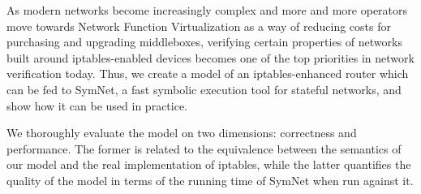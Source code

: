
As modern networks become increasingly complex and more and more operators move
towards Network Function Virtualization as a way of reducing costs for
purchasing and upgrading middleboxes, verifying certain properties of networks
built around iptables-enabled devices becomes one of the top priorities in
network verification today.  Thus, we create a model of an iptables-enhanced
router which can be fed to SymNet, a fast symbolic execution tool for stateful
networks, and show how it can be used in practice.

We thoroughly evaluate the model on two dimensions: correctness and
performance.  The former is related to the equivalence between the semantics of
our model and the real implementation of iptables, while the latter quantifies
the quality of the model in terms of the running time of SymNet when run
against it.
